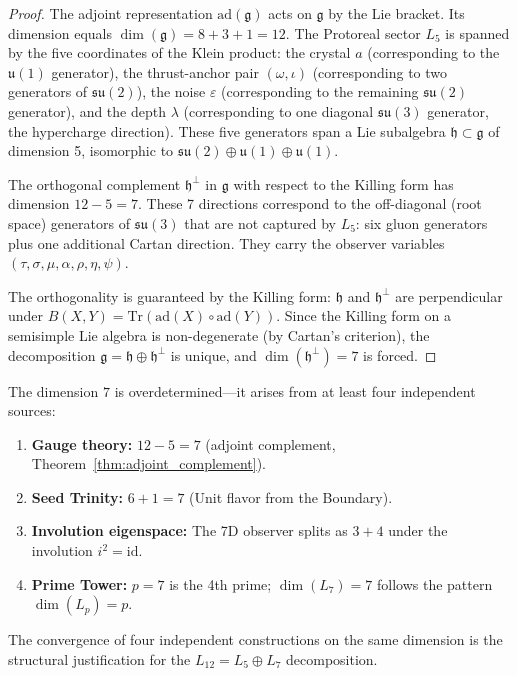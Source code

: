 \begin{proof}
The adjoint representation $\mathrm{ad}(\mathfrak{g})$ acts on $\mathfrak{g}$ by the Lie bracket. Its dimension equals $\dim(\mathfrak{g}) = 8 + 3 + 1 = 12$. The Protoreal sector $L_5$ is spanned by the five coordinates of the Klein product: the crystal $a$ (corresponding to the $\mathfrak{u}(1)$ generator), the thrust-anchor pair $(\omega, \iota)$ (corresponding to two generators of $\mathfrak{su}(2)$), the noise $\varepsilon$ (corresponding to the remaining $\mathfrak{su}(2)$ generator), and the depth $\lambda$ (corresponding to one diagonal $\mathfrak{su}(3)$ generator, the hypercharge direction). These five generators span a Lie subalgebra $\mathfrak{h} \subset \mathfrak{g}$ of dimension 5, isomorphic to $\mathfrak{su}(2) \oplus \mathfrak{u}(1) \oplus \mathfrak{u}(1)$.

The orthogonal complement $\mathfrak{h}^\perp$ in $\mathfrak{g}$ with respect to the Killing form has dimension $12 - 5 = 7$. These 7 directions correspond to the off-diagonal (root space) generators of $\mathfrak{su}(3)$ that are not captured by $L_5$: six gluon generators plus one additional Cartan direction. They carry the observer variables $(\tau, \sigma, \mu, \alpha, \rho, \eta, \psi)$.

The orthogonality is guaranteed by the Killing form: $\mathfrak{h}$ and $\mathfrak{h}^\perp$ are perpendicular under $B(X, Y) = \mathrm{Tr}(\mathrm{ad}(X) \circ \mathrm{ad}(Y))$. Since the Killing form on a semisimple Lie algebra is non-degenerate (by Cartan's criterion), the decomposition $\mathfrak{g} = \mathfrak{h} \oplus \mathfrak{h}^\perp$ is unique, and $\dim(\mathfrak{h}^\perp) = 7$ is forced. \qedhere
\end{proof}

\begin{remark}
The dimension $7$ is overdetermined---it arises from at least four independent sources:
\begin{enumerate}[noitemsep]
\item \textbf{Gauge theory:} $12 - 5 = 7$ (adjoint complement, Theorem~\ref{thm:adjoint_complement}).
\item \textbf{Seed Trinity:} $6 + 1 = 7$ (Unit flavor from the Boundary).
\item \textbf{Involution eigenspace:} The 7D observer splits as $3 + 4$ under the involution $i^2 = \mathrm{id}$.
\item \textbf{Prime Tower:} $p = 7$ is the 4th prime; $\dim(L_7) = 7$ follows the pattern $\dim(L_p) = p$.
\end{enumerate}
The convergence of four independent constructions on the same dimension is the structural justification for the $L_{12} = L_5 \oplus L_7$ decomposition.
\end{remark}

